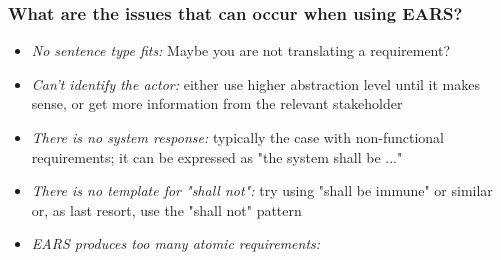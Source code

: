 \documentclass[aspectratio=169]{beamer}
\begin{document}
\begin{frame}
  \frametitle{What are the issues that can occur when using EARS?}
  \begin{itemize}
  \item {\it No sentence type fits:} Maybe you are not translating a requirement?
  \item {\it Can't identify the actor:} either use higher abstraction level until it makes sense, or get more information from the relevant stakeholder
  \item {\it There is no system response:}  typically the case with non-functional requirements; it can be expressed as "the system shall be ..."
  \item {\it There is no template for "shall not":} try using "shall be immune" or similar or, as last resort, use the "shall not" pattern
  \item {\it EARS produces too many atomic requirements:} 
  \end{itemize}
  
\end{frame}
\end{document}
